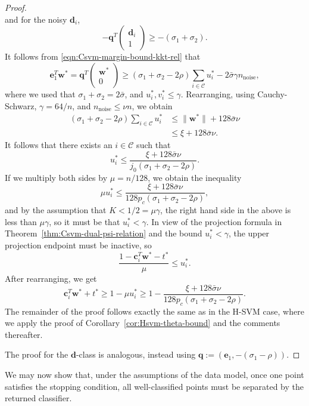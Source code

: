 \documentclass[twoside,11pt]{article}
\renewcommand{\c}{\bm{c}}
\renewcommand{\d}{\bm{d}}
\newcommand\q{\bm{q}}
\newcommand\w{\bm{w}}
\newcommand\e{\bm{e}}
\newcommand\CC{\mathcal{C}}
\begin{document}
\begin{proof}
\[    \]
    and for the noisy $\d_i$,
    \[
        -\q^T\begin{pmatrix}
            \d_i\\
            1
        \end{pmatrix} \geq -(\sigma_1 + \sigma_2).
    \]
    It follows from \eqref{eqn:Csvm-margin-bound-kkt-rel} that
    \[
        \e_1^T\w^* = \q^T\begin{pmatrix}
            \w^*\\
            0
        \end{pmatrix} \geq (\sigma_1 + \sigma_2 - 2\rho)\sum_{i \in \CC}u_i^* - 2\bar{\sigma}\gamma n_{\text{noise}},
    \]
    where we used that $\sigma_1 + \sigma_2 = 2\bar{\sigma}$, and $u_i^*,v_i^* \leq \gamma$. Rearranging, using Cauchy-Schwarz, $\gamma = 64/n$, and $n_{\text{noise}} \leq \nu n$, we obtain
    \begin{align*}
        (\sigma_1 + \sigma_2 - 2\rho)\sum_{i \in \CC}u_i^* &\leq \|\w^*\| + 128\bar{\sigma}\nu\\
        &\leq \xi + 128\bar{\sigma}\nu.
    \end{align*}
    It follows that there exists an $i \in \CC$ such that
    \[
        u_i^* \leq \frac{\xi + 128\bar{\sigma}\nu}{j_0(\sigma_1 + \sigma_2 - 2\rho)}.
    \]
    If we multiply both sides by $\mu = n/128$, we obtain the inequality
    \[
        \mu u_i^* \leq \frac{\xi + 128\bar{\sigma}\nu}{128p_c(\sigma_1 + \sigma_2 - 2\rho)},
    \]
    and by the assumption that $K < 1/2 = \mu\gamma$, the right hand side in the above is less than $\mu\gamma$, so it must be that $u_i^* < \gamma$. In view of the projection formula in Theorem~\ref{thm:Csvm-dual-psi-relation} and the bound $u_i^* < \gamma$, the upper projection endpoint must be inactive, so
    \[
        \frac{1-\c_i^T\w^* - t^*}{\mu} \leq u_i^*.
    \]
    After rearranging, we get
    \[
        \c_i^T\w^* + t^* \geq 1 - \mu u_i^* \geq 1 - \frac{\xi + 128\bar{\sigma}\nu}{128p_c(\sigma_1 + \sigma_2 - 2\rho)}.
    \]
    The remainder of the proof follows exactly the same as in the H-SVM case, where we apply the proof of Corollary~\ref{cor:Hsvm-theta-bound} and the comments thereafter.
    
    The proof for the $\d$-class is analogous, instead using $\q := (\e_1,-(\sigma_1 - \rho))$.
\end{proof}

We may now show that, under the assumptions of the data model, once one point satisfies the stopping condition, all well-classified points must be separated by the returned classifier.
\end{document}
